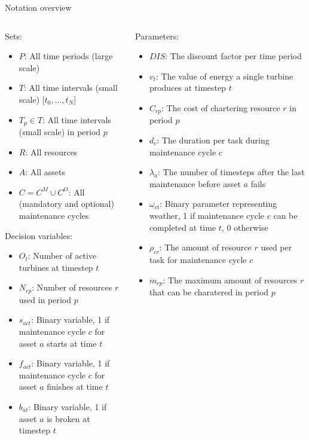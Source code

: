 \documentclass{beamer}
\begin{document}
\begin{frame}{Notation overview}
\tiny

\begin{columns}
\begin{column}{.48\textwidth}
Sets:
\begin{itemize}
\item $P$: All time periods (large scale)
\item $T$: All time intervals (small scale) [$t_0, \dots , t_N$]
\item $T_p \in T$: All time intervals (small scale) in period $p$
\item $R$: All resources
\item $A$: All assets
\item $C = C^M \cup C^O$: All (mandatory and optional) maintenance cycles
\end{itemize}

Decision variables:
\begin{itemize}
\item $O_{t}$: Number of active turbines at timestep $t$
\item $N_{rp}$: Number of resources $r$ used in period $p$
\item $s_{act}$: Binary variable, 1 if maintenance cycle $c$ for asset $a$ starts at time $t$
\item $f_{act}$: Binary variable, 1 if maintenance cycle $c$ for asset $a$ finishes at time $t$
\item $b_{at}$: Binary variable, 1 if asset $a$ is broken at timestep $t$
\end{itemize}
\end{column}

\hfill

\begin{column}{.48\textwidth}
Parameters:
\begin{itemize}
\item $DIS$: The discount factor per time period
\item $v_t$: The value of energy a single turbine produces at timestep $t$
\item $C_{rp}$: The cost of chartering resource $r$ in period $p$
\item $d_c$: The duration per task during maintenance cycle $c$
\item $\lambda_a$: The number of timesteps after the last maintenance before asset $a$ fails
\item $\omega_{ct}$: Binary parameter representing weather, 1 if maintenance cycle $c$ can be completed at time $t$, 0 otherwise
\item $\rho_{cr}$: The amount of resource $r$ used per task for maintenance cycle $c$
\item $m_{rp}$: The maximum amount of resources $r$ that can be charatered in period $p$
\end{itemize}
\end{column}
\end{columns}

\end{frame}
\end{document}
